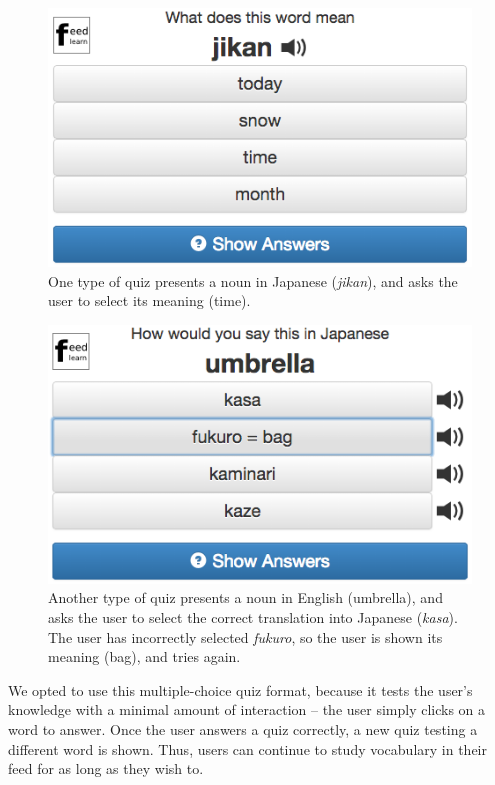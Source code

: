 \documentclass{sigchi}
\begin{document}
\begin{figure}
\centering
\includegraphics[width=1.0\columnwidth]{quiz1}
\caption{One type of quiz presents a noun in Japanese (\textit{jikan}), and asks the user to select its meaning (time).}
\label{fig:quiz1}
\end{figure}

\begin{figure}
\centering
\includegraphics[width=1.0\columnwidth]{quiz2}
\caption{Another type of quiz presents a noun in English (umbrella), and asks the user to select the correct translation into Japanese (\textit{kasa}). The user has incorrectly selected \textit{fukuro}, so the user is shown its meaning (bag), and tries again.}
\label{fig:quiz2}
\end{figure}

We opted to use this multiple-choice quiz format, because it tests the user's knowledge with a minimal amount of interaction -- the user simply clicks on a word to answer. Once the user answers a quiz correctly, a new quiz testing a different word is shown. Thus, users can continue to study vocabulary in their feed for as long as they wish to.
\end{document}
